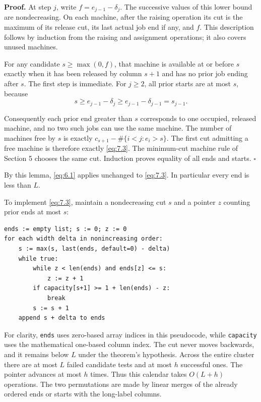\documentclass[11pt,a4paper]{article}
\begin{document}
\textbf{Proof.} At step \(j\), write \(f=e_{j-1}-\delta_j\). The successive values of this lower bound are nondecreasing. On each machine, after the raising operation its cut is the maximum of its release cut, its last actual job end if any, and \(f\). This description follows by induction from the raising and assignment operations; it also covers unused machines.

For any candidate \(s\ge\max(0,f)\), that machine is available at or before \(s\) exactly when it has been released by column \(s+1\) and has no prior job ending after \(s\). The first step is immediate. For \(j\ge2\), all prior starts are at most \(s\), because
\[
s\ge e_{j-1}-\delta_j
\ge e_{j-1}-\delta_{j-1}=s_{j-1}.
\]

Consequently each prior end greater than \(s\) corresponds to one occupied, released machine, and no two such jobs can use the same machine. The number of machines free by \(s\) is exactly \(c_{s+1}-\#\{i<j:e_i>s\}\). The first cut admitting a free machine is therefore exactly \eqref{eq:7.3}. The minimum-cut machine rule of Section 5 chooses the same cut. Induction proves equality of all ends and starts. \(\square\)

By this lemma, \eqref{eq:6.1} applies unchanged to \eqref{eq:7.3}. In particular every end is less than \(L\).

To implement \eqref{eq:7.3}, maintain a nondecreasing cut \(s\) and a pointer \(z\) counting prior ends at most \(s\):

\noindent\begin{minipage}{\linewidth}
\begin{verbatim}
ends := empty list; s := 0; z := 0
for each width delta in nonincreasing order:
    s := max(s, last(ends, default=0) - delta)
    while true:
        while z < len(ends) and ends[z] <= s:
            z := z + 1
        if capacity[s+1] >= 1 + len(ends) - z:
            break
        s := s + 1
    append s + delta to ends
\end{verbatim}
\end{minipage}

For clarity, \texttt{ends} uses zero-based array indices in this pseudocode, while \texttt{capacity} uses the mathematical one-based column index. The cut never moves backwards, and it remains below \(L\) under the theorem's hypothesis. Across the entire cluster there are at most \(L\) failed candidate tests and at most \(h\) successful ones. The pointer advances at most \(h\) times. Thus this calendar takes \(O(L+h)\) operations. The two permutations are made by linear merges of the already ordered ends or starts with the long-label columns.
\end{document}
